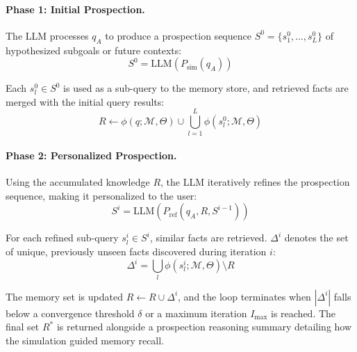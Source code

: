 \paragraph{Phase 1: Initial Prospection.} 
The LLM processes $q_A$ to produce a prospection sequence $S^0 = \{s^0_1, \ldots, s^0_L\}$ of hypothesized subgoals or future contexts:
\vspace{-.8em}
\begin{equation}
S^0 = \mathrm{LLM}(P_{\mathrm{sim}}(q_A))
\end{equation}

Each $s^0_l \in S^0$ is used as a sub-query to the memory store, and retrieved facts are merged with the initial query results:
\vspace{-.8em}
\begin{equation}
R \leftarrow \phi(q;\mathcal{M}, \Theta) \cup \bigcup_{l=1}^{L} \phi(s^0_l;\mathcal{M}, \Theta)
\end{equation}

\paragraph{Phase 2: Personalized Prospection.} 
Using the accumulated knowledge $R$, the LLM iteratively refines the prospection sequence, making it personalized to the user:
\begin{equation}
S^i = \mathrm{LLM}(P_{\mathrm{ref}}(q_A, R, S^{i-1}))
\end{equation}

For each refined sub-query $s^i_l \in S^i$, similar facts are retrieved. $\Delta^i$ denotes the set of unique, previously unseen facts discovered during iteration $i$:
\vspace{-.8em}
\begin{equation}
\Delta^i = \bigcup_l \phi(s^i_l;\mathcal{M}, \Theta) \setminus R
\end{equation}

The memory set is updated $R \leftarrow R \cup \Delta^i$, and the loop terminates when $|\Delta^i|$ falls below a convergence threshold $\delta$ or a maximum iteration $I_{\max}$ is reached. The final set $R^*$ is returned alongside a prospection reasoning summary detailing how the simulation guided memory recall.




